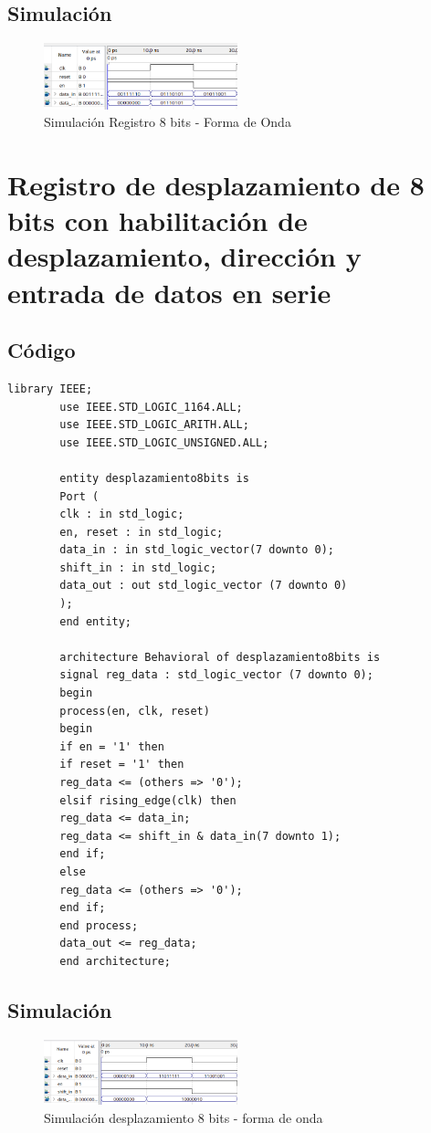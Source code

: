 \documentclass[conference]{IEEEtran}
\begin{document}
	\subsection{Simulación}
	\begin{figure}[h]
		\centering
		\includegraphics[width=0.5\textwidth]{media/registro8bit}
		\caption{Simulación Registro 8 bits - Forma de Onda}
		\label{fig:registro8bit}
	\end{figure}
	
	\section{Registro de desplazamiento de 8 bits con habilitación de desplazamiento, dirección y entrada de datos en serie}
	\subsection{Código}
	\begin{lstlisting}[numbers=none]
		library IEEE;
		use IEEE.STD_LOGIC_1164.ALL;
		use IEEE.STD_LOGIC_ARITH.ALL;
		use IEEE.STD_LOGIC_UNSIGNED.ALL;
		
		entity desplazamiento8bits is
		Port (
		clk : in std_logic;
		en, reset : in std_logic;
		data_in : in std_logic_vector(7 downto 0);
		shift_in : in std_logic;
		data_out : out std_logic_vector (7 downto 0)
		);
		end entity;
		
		architecture Behavioral of desplazamiento8bits is
		signal reg_data : std_logic_vector (7 downto 0);
		begin
		process(en, clk, reset)
		begin
		if en = '1' then
		if reset = '1' then
		reg_data <= (others => '0');
		elsif rising_edge(clk) then
		reg_data <= data_in;
		reg_data <= shift_in & data_in(7 downto 1);
		end if;
		else
		reg_data <= (others => '0');
		end if;
		end process;
		data_out <= reg_data;
		end architecture;
	\end{lstlisting}
	\subsection{Simulación}
	\begin{figure}[h]
		\centering
		\includegraphics[width=0.5\textwidth]{media/desplazamiento8bits}
		\caption{Simulación desplazamiento 8 bits - forma de onda}
		\label{fig:desplazamiento8bits}
	\end{figure}
	
	
	
\end{document}
